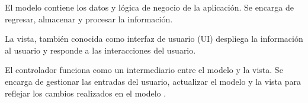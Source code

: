 El modelo contiene los datos y lógica de negocio de la aplicación. Se encarga de regresar, almacenar y procesar la información.

La vista, también conocida como interfaz de usuario (UI) despliega la información al usuario y responde a las interacciones del usuario.

El controlador funciona como un intermediario entre el modelo y la vista. Se encarga de gestionar las entradas del usuario, actualizar el modelo y la vista para reflejar los cambios realizados en el modelo \cite{L08}.
